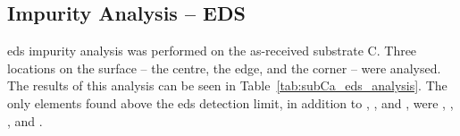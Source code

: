 
\subsection{Impurity Analysis -- EDS}

\Ac{eds} impurity analysis was performed on the as-received substrate C. Three locations on the surface -- the centre, the edge, and the corner -- were analysed. The results of this analysis can be seen in Table~\ref{tab:subCa_eds_analysis}. The only elements found above the \ac{eds} detection limit, in addition to , , and , were , , , and . 

